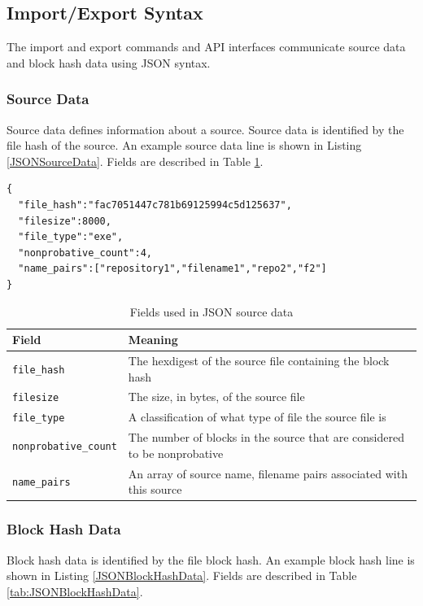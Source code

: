 \documentclass[11pt,fleqn]{article} %
\begin{document}
\subsection{Import/Export Syntax}
The import and export commands and API interfaces communicate source data and block hash data using JSON syntax.\\

\subsubsection{Source Data}
Source data defines information about a source. Source data is identified by the file hash of the source.  An example source data line is shown in Listing \ref{JSONSourceData}. Fields are described in Table \ref{tab:JSONSourceData}.\\

\lstset{style=customfile}
\begin{lstlisting}[caption={Example JSON source data used during import/export}, label=JSONSourceData]
{
  "file_hash":"fac7051447c781b69125994c5d125637",
  "filesize":8000,
  "file_type":"exe",
  "nonprobative_count":4,
  "name_pairs":["repository1","filename1","repo2","f2"]
}
\end{lstlisting}

\begin{table}[!ht]

\centering
\caption{Fields used in JSON source data}
\label{tab:JSONSourceData}
\begin{tabular}{|p{5 cm}|p{8.8 cm}|}
\hline \hline
\textbf{Field} & \textbf{Meaning} \\
\hline
\verb+file_hash+ & The hexdigest of the source file containing the block hash\\
\hline
\verb+filesize+ & The size, in bytes, of the source file\\
\hline
\verb+file_type+ & A classification of what type of file the source file is\\
\hline
\verb+nonprobative_count+ & The number of blocks in the source that are considered to be nonprobative\\
\hline
\verb+name_pairs+ & An array of source name, filename pairs associated with this source\\
\hline
\end{tabular}
\end{table}

\subsubsection{Block Hash Data}
Block hash data is identified by the file block hash.  An example block hash line is shown in Listing \ref{JSONBlockHashData}. Fields are described in Table \ref{tab:JSONBlockHashData}.\\
\end{document}
